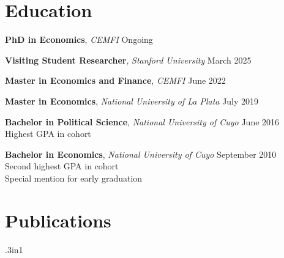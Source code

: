 \documentclass[margin,center,a4paper]{res}
\begin{document}
\address{daniel.fernandez@cemfi.edu.es}

\begin{resume}
\section{Education}

\textbf{PhD in Economics}, {\sl CEMFI} \hfill Ongoing\vspace{-0.75em}

\textbf{Visiting Student Researcher}, {\sl Stanford University} \hfill March 2025\vspace{-0.75em}

\textbf{Master in Economics and Finance}, {\sl CEMFI} \hfill June 2022\vspace{-0.75em}

\textbf{Master in Economics}, {\sl National University of La Plata} \hfill July 2019\vspace{-0.75em}

\textbf{Bachelor in Political Science}, {\sl National University of Cuyo} \hfill June 2016 \\
\hspace*{0.3in}\textbullet{} Highest GPA in cohort \vspace{-0.75em}

\textbf{Bachelor in Economics}, {\sl National University of Cuyo} \hfill September 2010 \\
\hspace*{0.3in}\textbullet{} Second highest GPA in cohort \\
\hspace*{0.3in}\textbullet{} Special mention for early graduation

\section{Publications}
\begin{hangparas}{.3in}{1}
	\sloppy
	

\end{hangparas}
\end{resume}
\end{document}
